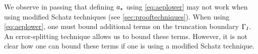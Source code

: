 We observe in passing that defining $a_{\star}$ using \cref{eq:aeplower} may not work when using modified Schatz techniques (see \cref{sec:prooftechniques}). When using \cref{eq:aeplower}, one must bound additional terms on the truncation boundary $\Gamma_{I}.$ An error-splitting technique allows us to bound these terms. However, it is not clear how one can bound these terms if one is using a modified Schatz technique.
\ere




